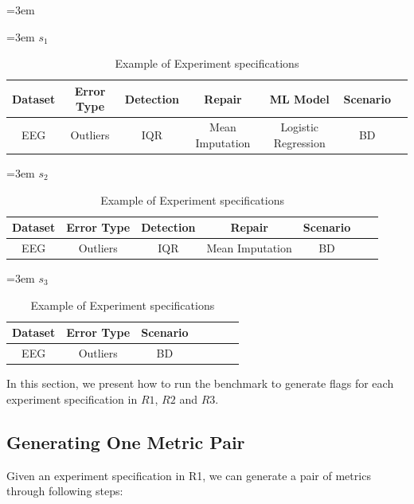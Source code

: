 \begin{table}[ht]	
	\leftskip=3em
	\begin{flushleft}
		\leftskip=3em
		\textbf{$s_{1}$}
	\end{flushleft}
	\begin{tabular}{|c|c|c|c|c|c|c|}
		\hline 
		Dataset & Error Type & Detection & Repair & ML Model & Scenario \\ 
		\hline 
		EEG & Outliers & IQR & Mean Imputation & Logistic Regression & BD  \\ 
		\hline 
	\end{tabular} \linebreak	
	
	\begin{flushleft}
		\leftskip=3em
		\textbf{$s_{2}$}
	\end{flushleft}
	\begin{tabular}{|c|c|c|c|c|c|c|}
		\hline 
		Dataset & Error Type & Detection & Repair & Scenario \\ 
		\hline 
		EEG & Outliers & IQR & Mean Imputation & BD  \\
		\hline 
	\end{tabular} \linebreak
	
	\begin{flushleft}
		\leftskip=3em
		\textbf{$s_{3}$}
	\end{flushleft}	
	
	\begin{tabular}{|c|c|c|c|c|c|c|}
		\hline 
		Dataset & Error Type & Scenario \\ 
		\hline 
		EEG & Outliers & BD \\ 
		\hline 
	\end{tabular} \linebreak
	\caption{Example of Experiment specifications}
	\label{table:experiment-specifications}
\end{table}

In this section, we present how to run the benchmark to generate
flags for each experiment specification in $R1$, $R2$ and $R3$. 

\subsection{Generating One Metric Pair}

Given an experiment specification in R1, we can generate a pair
of metrics through following steps:


